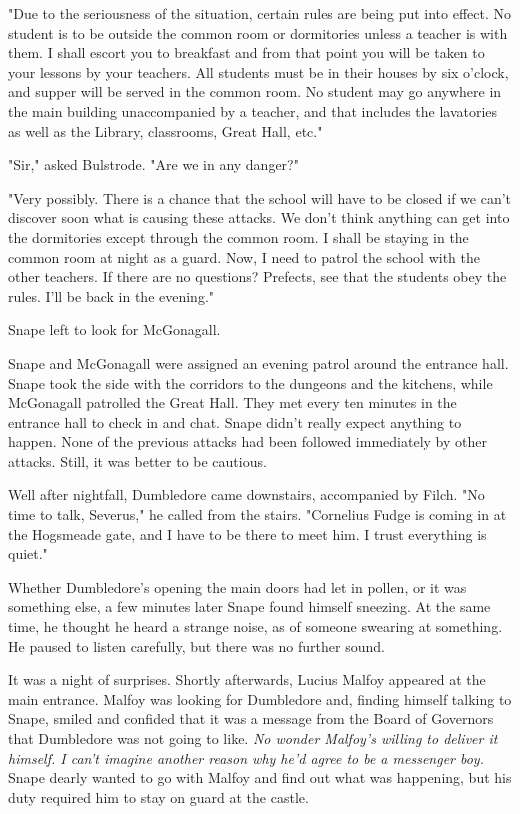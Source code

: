 \documentclass[a4paper,11pt]{article}
\begin{document}
"Due to the seriousness of the situation, certain rules are being put into effect. No student is to be outside the common room or dormitories unless a teacher is with them. I shall escort you to breakfast and from that point you will be taken to your lessons by your teachers. All students must be in their houses by six o'clock, and supper will be served in the common room. No student may go anywhere in the main building unaccompanied by a teacher, and that includes the lavatories as well as the Library, classrooms, Great Hall, etc."

"Sir," asked Bulstrode. "Are we in any danger?"

"Very possibly. There is a chance that the school will have to be closed if we can't discover soon what is causing these attacks. We don't think anything can get into the dormitories except through the common room. I shall be staying in the common room at night as a guard. Now, I need to patrol the school with the other teachers. If there are no questions? Prefects, see that the students obey the rules. I'll be back in the evening."

Snape left to look for McGonagall.

Snape and McGonagall were assigned an evening patrol around the entrance hall. Snape took the side with the corridors to the dungeons and the kitchens, while McGonagall patrolled the Great Hall. They met every ten minutes in the entrance hall to check in and chat. Snape didn't really expect anything to happen. None of the previous attacks had been followed immediately by other attacks. Still, it was better to be cautious.

Well after nightfall, Dumbledore came downstairs, accompanied by Filch. "No time to talk, Severus," he called from the stairs. "Cornelius Fudge is coming in at the Hogsmeade gate, and I have to be there to meet him. I trust everything is quiet."

Whether Dumbledore's opening the main doors had let in pollen, or it was something else, a few minutes later Snape found himself sneezing. At the same time, he thought he heard a strange noise, as of someone swearing at something. He paused to listen carefully, but there was no further sound.

It was a night of surprises. Shortly afterwards, Lucius Malfoy appeared at the main entrance. Malfoy was looking for Dumbledore and, finding himself talking to Snape, smiled and confided that it was a message from the Board of Governors that Dumbledore was not going to like. \emph{No wonder Malfoy's willing to deliver it himself. I can't imagine another reason why he'd agree to be a messenger boy.} Snape dearly wanted to go with Malfoy and find out what was happening, but his duty required him to stay on guard at the castle.
\end{document}

